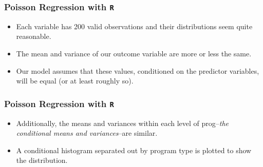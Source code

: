 \documentclass[MASTER.tex]{subfiles}
\begin{document}
\begin{frame}[fragile]

\frametitle{Poisson Regression with \texttt{R}}
\Large

\begin{itemize}
\item Each variable has 200 valid observations and their distributions seem quite reasonable. 
\item The mean and variance of our outcome variable are more or less the same. 
\item Our model assumes that these values, conditioned on the predictor variables, will be equal (or at least roughly so).
\end{itemize}
\end{frame}
\begin{frame}[fragile]
\frametitle{Poisson Regression with \texttt{R}}
\Large
\begin{itemize}
\item Additionally, the means and variances within each level of prog--\textit{the conditional means and variances}--are similar. 
\item A conditional histogram separated out by program type is plotted to show the distribution.
\end{itemize}


\end{frame}

%
%
%
%
%
		
%
\end{document}
